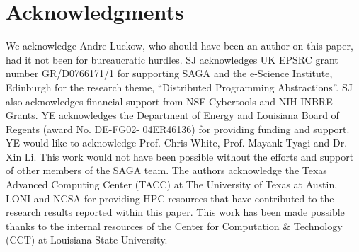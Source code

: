 \documentclass[conference,final]{IEEEtran}
\begin{document}
\section{Acknowledgments}
We acknowledge Andre Luckow, who should have been an author on this
paper, had it not been for bureaucratic hurdles.  SJ acknowledges UK
EPSRC grant number GR/D0766171/1 for supporting SAGA and the e-Science
Institute, Edinburgh for the research theme, ``Distributed Programming
Abstractions''.  SJ also acknowledges financial support from
NSF-Cybertools and NIH-INBRE Grants. YE acknowledges the Department of
Energy and Louisiana Board of Regents (award No. DE-FG02- 04ER46136)
for providing funding and support. YE would like to acknowledge
Prof. Chris White, Prof. Mayank Tyagi and Dr. Xin Li. This work would
not have been possible without the efforts and support of other
members of the SAGA team. The authors acknowledge the Texas Advanced
Computing Center (TACC) at The University of Texas at Austin, LONI and
NCSA for providing HPC resources that have contributed to the research
results reported within this paper. This work has been made possible
thanks to the internal resources of the Center for Computation \&
Technology (CCT) at Louisiana State University.

 

\end{document}
